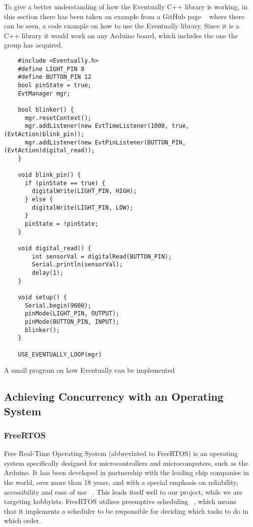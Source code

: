 To give a better understanding of how the Eventually C++ library is working, in this section there has been taken an example from a GitHub page ~\cite{bartlettEventually2022Bartlett} where there can be seen, a code example on how to use the Eventually library. Since it is a C++ library it would work on any Arduino board, which includes the one the group has acquired.


\begin{listing}
  \begin{verbatim}
    #include <Eventually.h>
    #define LIGHT_PIN 8
    #define BUTTON_PIN 12
    bool pinState = true;
    EvtManager mgr;

    bool blinker() {
      mgr.resetContext();
      mgr.addListener(new EvtTimeListener(1000, true, (EvtAction)blink_pin)); 
      mgr.addListener(new EvtPinListener(BUTTON_PIN, (EvtAction)digital_read));
    }

    void blink_pin() {
      if (pinState == true) {
        digitalWrite(LIGHT_PIN, HIGH);
      } else {
        digitalWrite(LIGHT_PIN, LOW);
      }
      pinState = !pinState;
    }

    void digital_read() {
        int sensorVal = digitalRead(BUTTON_PIN);
        Serial.println(sensorVal);
        delay(1);
    }

    void setup() {
      Serial.begin(9600);
      pinMode(LIGHT_PIN, OUTPUT);
      pinMode(BUTTON_PIN, INPUT);
      blinker();
    }

    USE_EVENTUALLY_LOOP(mgr)
  \end{verbatim}
  \caption{A small program on how Eventually can be implemented}
  \label{lst:eventuallyexample}
\end{listing}


\subsection{Achieving Concurrency with an Operating System}



\subsubsection{FreeRTOS}
Free Real-Time Operating System (abbreviated to FreeRTOS) is an operating system specifically designed for microcontrollers and microcomputers, such as the Arduino. It has been developed in partnership with the leading chip companies in the world, over more than 18 years, and with a special emphasis on reliability, accessibility and ease of use ~\cite{AboutRTOS}. This leads itself well to our project, while we are targeting hobbyists. FreeRTOS utilises preemptive scheduling ~\cite{SchedulingRTOS}, which means that it implements a scheduler to be responsible for deciding which tasks to do in which order.



